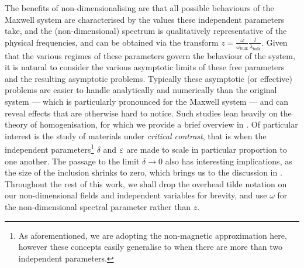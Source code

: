 The benefits of non-dimensionalising are that all possible behaviours of the Maxwell system are characterised by the values these independent parameters take, and the (non-dimensional) spectrum is qualitatively representative of the physical frequencies, and can be obtained via the transform $z = \frac{\omega}{\omega_{\mathrm{bulk}}} \frac{l}{\lambda_{\mathrm{bulk}}}$.
Given that the various regimes of these parameters govern the behaviour of the system, it is natural to consider the various asymptotic limits of these free parameters and the resulting asymptotic problems.
Typically these asymptotic (or effective) problems are easier to handle analytically and numerically than the original system --- which is particularly pronounced for the Maxwell system --- and can reveal effects that are otherwise hard to notice.
Such studies lean heavily on the theory of homogenisation, for which we provide a brief overview in .
Of particular interest is the study of materials under \emph{critical contrast}, that is when the independent parameters\footnote{As aforementioned, we are adopting the non-magnetic approximation here, however these concepts easily generalise to when there are more than two independent parameters.} $\delta$ and $\varepsilon$ are made to scale in particular proportion to one another.
The passage to the limit $\delta\rightarrow0$ also has interesting implications, as the size of the inclusion shrinks to zero, which brings us to the discussion in .
Throughout the rest of this work, we shall drop the overhead tilde notation on our non-dimensional fields and independent variables for brevity, and use $\omega$ for the non-dimensional spectral parameter rather than $z$.

